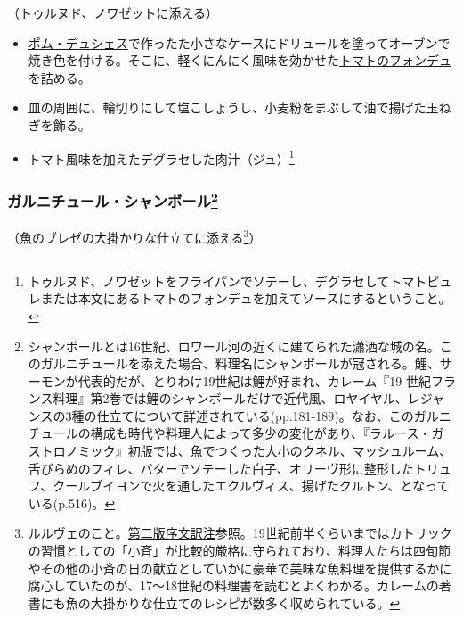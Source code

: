 \begin{recette}
（トゥルヌド、ノワゼットに添える）

\begin{itemize}
\item
  \protect\hyperlink{pommes-de-terre-duchesse}{ポム・デュシェス}で作ったた小さなケースにドリュールを塗ってオーブンで焼き色を付ける。そこに、軽くにんにく風味を効かせた\protect\hyperlink{portugaise}{トマトのフォンデュ}を詰める。
\item
  皿の周囲に、輪切りにして塩こしょうし、小麦粉をまぶして油で揚げた玉ねぎを飾る。
\item
  トマト風味を加えたデグラセした肉汁（ジュ）\footnote{トゥルヌド、ノワゼットをフライパンでソテーし、デグラセしてトマトピュレまたは本文にあるトマトのフォンデュを加えてソースにするということ。}
\end{itemize}

\hypertarget{garniture-chambord}{%
\subsubsection[ガルニチュール・シャンボール]{\texorpdfstring{ガルニチュール・シャンボール\footnote{シャンボールとは16世紀、ロワール河の近くに建てられた瀟洒な城の名。このガルニチュールを添えた場合、料理名にシャンボールが冠される。鯉、サーモンが代表的だが、とりわけ19世紀は鯉が好まれ、カレーム『19
  世紀フランス料理』第2巻では鯉のシャンボールだけで近代風、ロヤイヤル、レジャンスの3種の仕立てについて詳述されている(pp.181-189)。なお、このガルニチュールの構成も時代や料理人によって多少の変化があり、『ラルース・ガストロノミック』初版では、魚でつくった大小のクネル、マッシュルーム、舌びらめのフィレ、バターでソテーした白子、オリーヴ形に整形したトリュフ、クールブイヨンで火を通したエクルヴィス、揚げたクルトン、となっている(p.516)。}}{ガルニチュール・シャンボール}}\label{garniture-chambord}}



（魚のブレゼの大掛かりな仕立てに添える\footnote{ルルヴェのこと。\protect\hyperlink{releve}{第二版序文訳注}参照。19世紀前半くらいまではカトリックの習慣としての「小斉」が比較的厳格に守られており、料理人たちは四旬節やその他の小斉の日の献立としていかに豪華で美味な魚料理を提供するかに腐心していたのが、17〜18世紀の料理書を読むとよくわかる。カレームの著書にも魚の大掛かりな仕立てのレシピが数多く収められている。}）


\end{recette}

